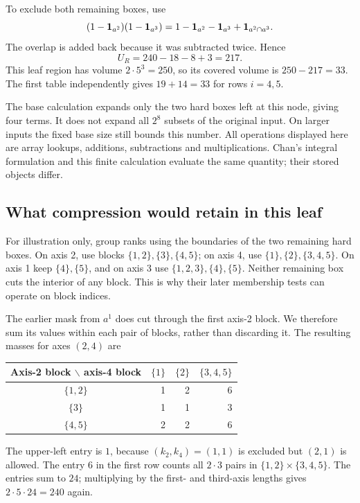 To exclude both remaining boxes, use
\[
 (1-\mathbf 1_{a^2})(1-\mathbf 1_{a^3})
   =1-\mathbf 1_{a^2}-\mathbf 1_{a^3}+\mathbf 1_{a^2\cap a^3}.
\]
The overlap is added back because it was subtracted twice. Hence
\[
                      U_R=240-18-8+3=217.
\]
This leaf region has volume $2\cdot5^3=250$, so its covered volume is
$250-217=33$. The first table independently gives $19+14=33$ for rows
$i=4,5$.

The base calculation expands only the two hard boxes left at this node,
giving four terms. It does not expand all $2^8$ subsets of the original
input. On larger inputs the fixed base size still bounds this number.
All operations displayed here are array lookups, additions,
subtractions and multiplications. Chan's integral formulation and this
finite calculation evaluate the same quantity; their stored objects differ.

\clearpage
\subsection{What compression would retain in this leaf}
For illustration only, group ranks using the boundaries of the two
remaining hard boxes. On axis 2, use blocks $\{1,2\},\{3\},\{4,5\}$;
on axis 4, use $\{1\},\{2\},\{3,4,5\}$. On axis 1 keep $\{4\},\{5\}$,
and on axis 3 use $\{1,2,3\},\{4\},\{5\}$. Neither remaining box
cuts the interior of any block. This is why their later membership
tests can operate on block indices.

The earlier mask from $a^1$ does cut through the first axis-2 block.
We therefore sum its values within each pair of blocks, rather than
discarding it. The resulting masses for axes $(2,4)$ are
\begin{center}
\begin{tabular}{@{}c|rrr@{}}
\toprule
Axis-2 block $\backslash$ axis-4 block&$\{1\}$&$\{2\}$&$\{3,4,5\}$\\\midrule
$\{1,2\}$&1&2&6\\
$\{3\}$&1&1&3\\
$\{4,5\}$&2&2&6\\\bottomrule
\end{tabular}
\end{center}
The upper-left entry is $1$, because $(k_2,k_4)=(1,1)$ is excluded but
$(2,1)$ is allowed. The entry $6$ in the first row counts all
$2\cdot3$ pairs in $\{1,2\}\times\{3,4,5\}$.
The entries sum to $24$; multiplying by the first- and third-axis
lengths gives $2\cdot5\cdot24=240$ again.

